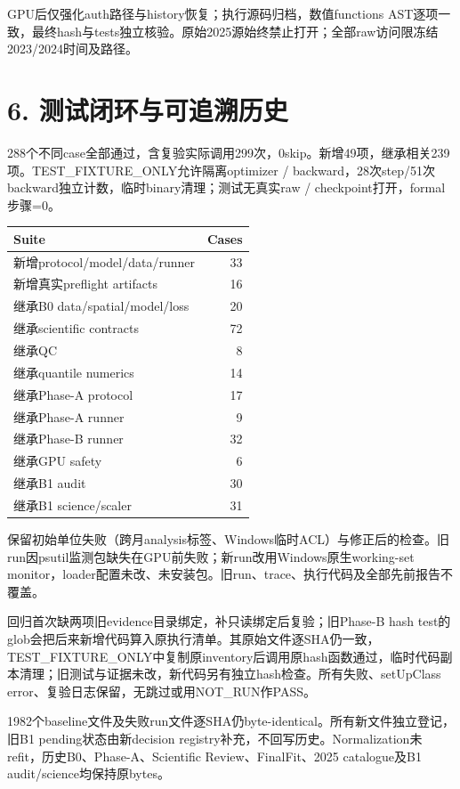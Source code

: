 \documentclass[10pt,a4paper,fontset=windows]{ctexart}
\begin{document}
GPU后仅强化auth路径与history恢复；执行源码归档，数值functions AST逐项一致，最终hash与tests独立核验。原始2025源始终禁止打开；全部raw访问限冻结2023/2024时间及路径。
\newpage
\begingroup\small\setlength{\parskip}{4pt}
\section*{6. 测试闭环与可追溯历史}
288个不同case全部通过，含复验实际调用299次，0skip。新增49项，继承相关239项。TEST\_FIXTURE\_ONLY允许隔离optimizer / backward，28次step/51次backward独立计数，临时binary清理；测试无真实raw / checkpoint打开，formal步骤=0。
\begin{center}{\small\begin{tabular}{lr}\toprule
Suite & Cases\\\midrule
新增protocol/model/data/runner & 33 \\
新增真实preflight artifacts & 16 \\
继承B0 data/spatial/model/loss & 20 \\
继承scientific contracts & 72 \\
继承QC & 8 \\
继承quantile numerics & 14 \\
继承Phase-A protocol & 17 \\
继承Phase-A runner & 9 \\
继承Phase-B runner & 32 \\
继承GPU safety & 6 \\
继承B1 audit & 30 \\
继承B1 science/scaler & 31 \\
\bottomrule\end{tabular}}\end{center}
保留初始单位失败（跨月analysis标签、Windows临时ACL）与修正后的检查。旧run因psutil监测包缺失在GPU前失败；新run改用Windows原生working-set monitor，loader配置未改、未安装包。旧run、trace、执行代码及全部先前报告不覆盖。

回归首次缺两项旧evidence目录绑定，补只读绑定后复验；旧Phase-B hash test的glob会把后来新增代码算入原执行清单。其原始文件逐SHA仍一致，TEST\_FIXTURE\_ONLY中复制原inventory后调用原hash函数通过，临时代码副本清理；旧测试与证据未改，新代码另有独立hash检查。所有失败、setUpClass error、复验日志保留，无跳过或用NOT\_RUN作PASS。

1982个baseline文件及失败run文件逐SHA仍byte-identical。所有新文件独立登记，旧B1 pending状态由新decision registry补充，不回写历史。Normalization未refit，历史B0、Phase-A、Scientific Review、FinalFit、2025 catalogue及B1 audit/science均保持原bytes。
\end{document}
